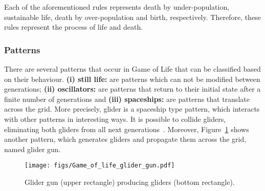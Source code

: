 \documentclass[12pt]{article}
\begin{document}
Each of the aforementioned rules represents death by under-population, sustainable life, death by over-population and birth, respectively. Therefore, these rules represent the process of life and death.


\subsubsection{Patterns}

There are several patterns that occur in Game of Life that can be classified based on their behaviour. \textbf{(i) still life:} are patterns which can not be modified between generations; \textbf{(ii) oscillators:} are patterns that return to their initial state after a finite number of generations and \textbf{(iii) spaceships:} are patterns that translate across the grid. More precisely, glider is a spaceship type pattern, which interacts with other patterns in interesting ways. It is possible to collide gliders, eliminating both gliders from all next generations~\cite{Adamatzky:book:2012}. Moreover, Figure~\ref{fig:glider_gun} shows another pattern, which generates gliders and propagate them across the grid, named glider gun.


\begin{figure}[h]
    \centering
    \texttt{[image: figs/Game\_of\_life\_glider\_gun.pdf]}
    \caption{Glider gun (upper rectangle) producing gliders (bottom rectangle).}
    \label{fig:glider_gun}
\end{figure}
\end{document}
